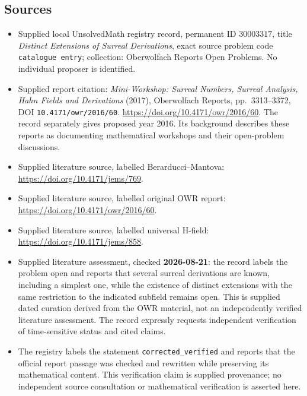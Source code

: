 \documentclass[11pt]{article}
\begin{document}
\subsection{Sources}
\begin{itemize}
\item Supplied local UnsolvedMath registry record, permanent ID \(30003317\), title \emph{Distinct Extensions of Surreal Derivations}, exact source problem code \texttt{catalogue entry}; collection: Oberwolfach Reports Open Problems. No individual proposer is identified.
\item Supplied report citation: \emph{Mini-Workshop: Surreal Numbers, Surreal Analysis, Hahn Fields and Derivations} (2017), Oberwolfach Reports, pp.\ 3313--3372, DOI \texttt{10.4171/owr/2016/60}. \url{https://doi.org/10.4171/owr/2016/60}. The record separately gives proposed year 2016. Its background describes these reports as documenting mathematical workshops and their open-problem discussions.
\item Supplied literature source, labelled Berarducci--Mantova: \url{https://doi.org/10.4171/jems/769}.
\item Supplied literature source, labelled original OWR report: \url{https://doi.org/10.4171/owr/2016/60}.
\item Supplied literature source, labelled universal H-field: \url{https://doi.org/10.4171/jems/858}.
\item Supplied literature assessment, checked \textbf{2026-08-21}: the record labels the problem open and reports that several surreal derivations are known, including a simplest one, while the existence of distinct extensions with the same restriction to the indicated subfield remains open. This is supplied dated curation derived from the OWR material, not an independently verified literature assessment. The record expressly requests independent verification of time-sensitive status and cited claims.
\item The registry labels the statement \texttt{corrected\_verified} and reports that the official report passage was checked and rewritten while preserving its mathematical content. This verification claim is supplied provenance; no independent source consultation or mathematical verification is asserted here.
\end{itemize}
\end{document}
